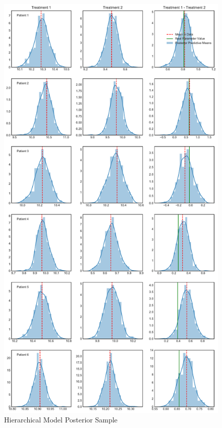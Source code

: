 \documentclass[12pt,a4paper,leqno]{report}
\theoremstyle{plain}
\theoremstyle{definition}
\theoremstyle{remark}
\begin{document}
\bigskip
\begin{figure}[H]
    \caption{Hierarchical Model Posterior Sample}
    \label{hierarchicalmodelposteriorsampling}
    \bigskip
    \includegraphics[width=\textwidth,height=\textheight,keepaspectratio]{hierarchical_model_posterior_sampling.pdf}
\end{figure}
\bigskip
\end{document}
